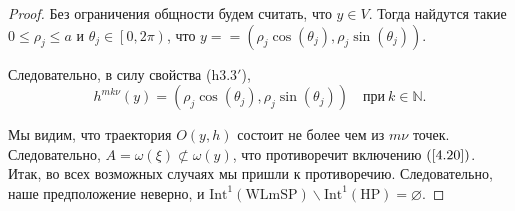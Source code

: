 \documentclass[12pt]{article}
\begin{document}
\begin{proof}
Без ограничения общности будем считать, что $y\!\in\! V$. Тогда найдутся такие $0\leq\rho_j\leq a$ и $\theta_j\in\left[0,2\pi\right)$, что $y=\allowbreak=(\rho_j\cos(\theta_j),\rho_j\sin(\theta_j))$.

Следовательно, в силу свойства (h3.3$'$),
$$h^{mk\nu}(y)=(\rho_j\cos(\theta_j),\rho_j\sin(\theta_j))\quad\textrm{при}\  k\!\in\!\mathbb{N}.$$

Мы видим, что траектория $O(y,h)$ состоит не более чем из $m\nu$ точек. Следовательно, $A=\omega(\xi)\not\subset\omega(y)$, что противоречит включению $(\ref{4.20})$.
\\

Итак, во всех возможных случаях мы пришли к противоречию. Следовательно, наше предположение неверно, и $\mbox{Int}^1(\mbox{WLmSP})\backslash\mbox{Int}^1(\mbox{HP})=\varnothing$.
\end{proof}
\end{document}
